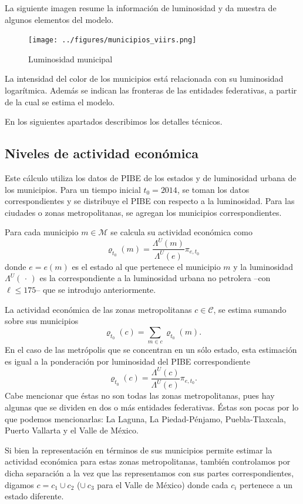 \documentclass[]{article}
\begin{document}
La siguiente imagen resume la información de luminosidad y da muestra de
algunos elementos del modelo.

\begin{figure}[htbp]
\centering
\texttt{[image: ../figures/municipios\_viirs.png]}
\caption{Luminosidad municipal}
\end{figure}

La intensidad del color de los municipios está relacionada con su
luminosidad logarítmica. Además se indican las fronteras de las
entidades federativas, a partir de la cual se estima el modelo.

En los siguientes apartados describimos los detalles técnicos.

\subsection{Niveles de actividad
económica}\label{niveles-de-actividad-economica}

Este cálculo utiliza los datos de PIBE de los estados y de luminosidad
urbana de los municipios. Para un tiempo inicial \(t_0 = 2014\), se
toman los datos correspondientes y se distribuye el PIBE con respecto a
la luminosidad. Para las ciudades o zonas metropolitanas, se agregan los
municipios correspondientes.

Para cada municipio \(m \in \mathcal M\) se calcula su actividad
económica como
\[ \mathrm{\varrho}_{t_0}(m) = \frac{\Lambda^{U}(m)}{\Lambda^{U}(e)} \pi_{e,t_0}\]
donde \(e = e(m)\) es el estado al que pertenece el municipio \(m\) y la
luminosidad \(\Lambda^U(\,\cdot\,)\) es la correspondiente a la
luminosidad urbana no petrolera --con \(\ell \leq 175\)-- que se
introdujo anteriormente.

La actividad económica de las zonas metropolitanas \(c \in \mathcal C\),
se estima sumando sobre sus municipios
\[ \varrho_{t_0}(c)=\sum_{m \in c}\varrho_{t_0}(m).\] En el caso de las
metrópolis que se concentran en un sólo estado, esta estimación es igual
a la ponderación por luminosidad del PIBE correspondiente
\[ \varrho_{t_0}(c)=\frac{\Lambda^U(c)}{\Lambda^U(e)}\pi_{e,t_0}.\] Cabe
mencionar que éstas no son todas las zonas metropolitanas, pues hay
algunas que se dividen en dos o más entidades federativas. Éstas son
pocas por lo que podemos mencionarlas: La Laguna, La Piedad-Pénjamo,
Puebla-Tlaxcala, Puerto Vallarta y el Valle de México.

Si bien la representación en términos de sus municipios permite estimar
la actividad económica para estas zonas metropolitanas, también
controlamos por dicha separación a la vez que las representamos con sus
partes correspondientes, digamos \(c=c_1\cup c_2\) (\(\cup\ c_3\) para
el Valle de México) donde cada \(c_i\) pertenece a un estado diferente.
\end{document}
